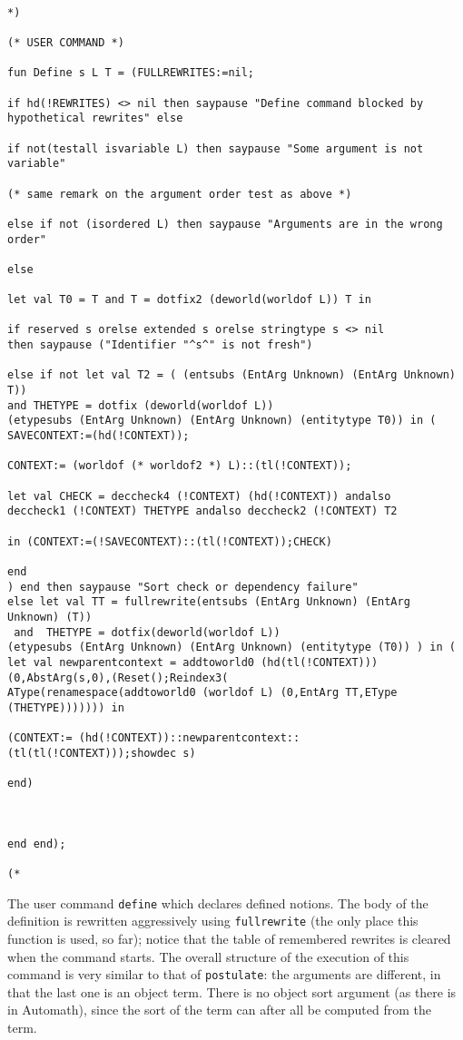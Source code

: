 \documentclass{article}
\begin{document}
\begin{verbatim}

*)

(* USER COMMAND *)

fun Define s L T = (FULLREWRITES:=nil;

if hd(!REWRITES) <> nil then saypause "Define command blocked by hypothetical rewrites" else

if not(testall isvariable L) then saypause "Some argument is not variable"

(* same remark on the argument order test as above *)

else if not (isordered L) then saypause "Arguments are in the wrong order"

else 

let val T0 = T and T = dotfix2 (deworld(worldof L)) T in

if reserved s orelse extended s orelse stringtype s <> nil 
then saypause ("Identifier "^s^" is not fresh")

else if not let val T2 = ( (entsubs (EntArg Unknown) (EntArg Unknown) T))
and THETYPE = dotfix (deworld(worldof L)) 
(etypesubs (EntArg Unknown) (EntArg Unknown) (entitytype T0)) in (
SAVECONTEXT:=(hd(!CONTEXT)); 

CONTEXT:= (worldof (* worldof2 *) L)::(tl(!CONTEXT));  

let val CHECK = deccheck4 (!CONTEXT) (hd(!CONTEXT)) andalso 
deccheck1 (!CONTEXT) THETYPE andalso deccheck2 (!CONTEXT) T2

in (CONTEXT:=(!SAVECONTEXT)::(tl(!CONTEXT));CHECK) 

end
) end then saypause "Sort check or dependency failure"
else let val TT = fullrewrite(entsubs (EntArg Unknown) (EntArg Unknown) (T))
 and  THETYPE = dotfix(deworld(worldof L))
(etypesubs (EntArg Unknown) (EntArg Unknown) (entitytype (T0)) ) in (
let val newparentcontext = addtoworld0 (hd(tl(!CONTEXT)))
(0,AbstArg(s,0),(Reset();Reindex3(
AType(renamespace(addtoworld0 (worldof L) (0,EntArg TT,EType (THETYPE))))))) in

(CONTEXT:= (hd(!CONTEXT))::newparentcontext::(tl(tl(!CONTEXT)));showdec s) 

end)



end end);

(*

\end{verbatim}

The user command {\tt define} which declares defined notions.  The body of the definition is rewritten aggressively using {\tt fullrewrite} (the only place this function is used, so far);  notice that the table of remembered rewrites is cleared when the command starts.  The overall structure of the execution of this command is very similar to that of {\tt postulate}:  the arguments are different, in that the last one is an object term.  There is no object sort argument
(as there is in Automath), since the sort of the term can after all be computed from the term.
\end{document}
